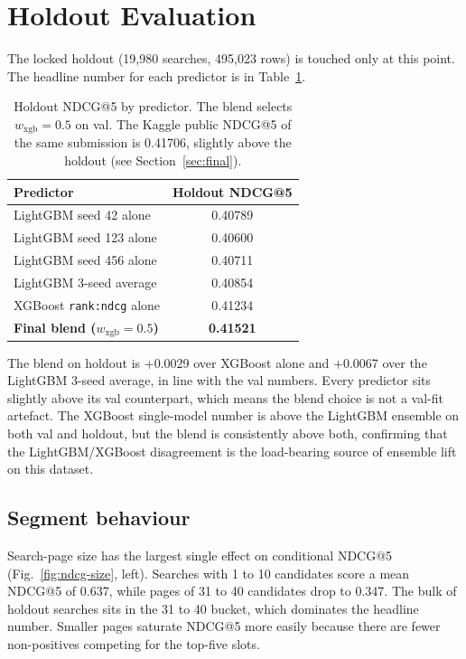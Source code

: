 \documentclass[runningheads]{llncs}
\begin{document}
\section{Holdout Evaluation}\label{sec:eval}

The locked holdout (19{,}980 searches, 495{,}023 rows) is touched only at this point. The headline number for each predictor is in Table~\ref{tab:hold}.

\begin{table}[t]
\centering
\caption{Holdout NDCG@5 by predictor. The blend selects $w_{\text{xgb}} = 0.5$ on val. The Kaggle public NDCG@5 of the same submission is 0.41706, slightly above the holdout (see Section~\ref{sec:final}).}
\label{tab:hold}
\begin{tabular}{lc}
\toprule
Predictor & Holdout NDCG@5 \\
\midrule
LightGBM seed 42 alone & 0.40789 \\
LightGBM seed 123 alone & 0.40600 \\
LightGBM seed 456 alone & 0.40711 \\
LightGBM 3-seed average & 0.40854 \\
XGBoost \texttt{rank:ndcg} alone & 0.41234 \\
\textbf{Final blend ($w_{\text{xgb}} = 0.5$)} & \textbf{0.41521} \\
\bottomrule
\end{tabular}
\end{table}

The blend on holdout is +0.0029 over XGBoost alone and +0.0067 over the LightGBM 3-seed average, in line with the val numbers. Every predictor sits slightly above its val counterpart, which means the blend choice is not a val-fit artefact. The XGBoost single-model number is above the LightGBM ensemble on both val and holdout, but the blend is consistently above both, confirming that the LightGBM/XGBoost disagreement is the load-bearing source of ensemble lift on this dataset.

\subsection{Segment behaviour}

Search-page size has the largest single effect on conditional NDCG@5 (Fig.~\ref{fig:ndcg-size}, left). Searches with 1 to 10 candidates score a mean NDCG@5 of 0.637, while pages of 31 to 40 candidates drop to 0.347. The bulk of holdout searches sits in the 31 to 40 bucket, which dominates the headline number. Smaller pages saturate NDCG@5 more easily because there are fewer non-positives competing for the top-five slots.
\end{document}
